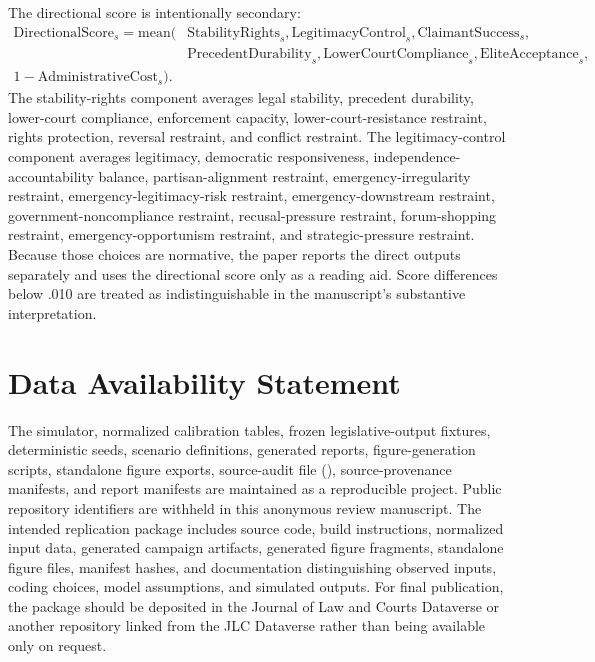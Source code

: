 \documentclass[
    journal=jlc,
    manuscript=research-article,
    year=2026,
  ]{cup-journal}
\begin{document}
The directional score is intentionally secondary:
\[
\begin{aligned}
\mathrm{DirectionalScore}_s = \mathrm{mean}(&\mathrm{StabilityRights}_s,
\mathrm{LegitimacyControl}_s,\mathrm{ClaimantSuccess}_s,\\
&\mathrm{PrecedentDurability}_s,\mathrm{LowerCourtCompliance}_s,
\mathrm{EliteAcceptance}_s,\\
1-\mathrm{AdministrativeCost}_s).
\end{aligned}
\]
The stability-rights component averages legal stability, precedent durability, lower-court compliance, enforcement capacity, lower-court-resistance restraint, rights protection, reversal restraint, and conflict restraint. The legitimacy-control component averages legitimacy, democratic responsiveness, independence-accountability balance, partisan-alignment restraint, emergency-irregularity restraint, emergency-legitimacy-risk restraint, emergency-downstream restraint, government-noncompliance restraint, recusal-pressure restraint, forum-shopping restraint, emergency-opportunism restraint, and strategic-pressure restraint. Because those choices are normative, the paper reports the direct outputs separately and uses the directional score only as a reading aid. Score differences below .010 are treated as indistinguishable in the manuscript's substantive interpretation.

\section*{Data Availability Statement}

The simulator, normalized calibration tables, frozen legislative-output fixtures, deterministic seeds, scenario definitions, generated reports, figure-generation scripts, standalone figure exports, source-audit file (), source-provenance manifests, and report manifests are maintained as a reproducible project. Public repository identifiers are withheld in this anonymous review manuscript. The intended replication package includes source code, build instructions, normalized input data, generated campaign artifacts, generated figure fragments, standalone figure files, manifest hashes, and documentation distinguishing observed inputs, coding choices, model assumptions, and simulated outputs. For final publication, the package should be deposited in the Journal of Law and Courts Dataverse or another repository linked from the JLC Dataverse rather than being available only on request.
\end{document}
